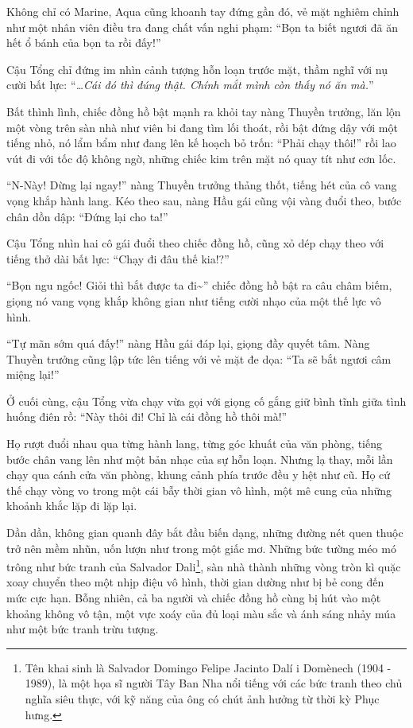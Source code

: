 \documentclass[../main.tex]{subfiles}
\begin{document}
Không chỉ có Marine, Aqua cũng khoanh tay đứng gần đó, vẻ mặt nghiêm chỉnh như một nhân viên điều tra đang chất vấn nghi phạm: ``Bọn ta biết ngươi đã ăn hết ổ bánh của bọn ta rồi đấy!''

Cậu Tổng chỉ đứng im nhìn cảnh tượng hỗn loạn trước mặt, thầm nghĩ với nụ cười bất lực: ``\textit{\dots Cái đó thì đúng thật. Chính mắt mình còn thấy nó ăn mà.}''

Bất thình lình, chiếc đồng hồ bật mạnh ra khỏi tay nàng Thuyền trưởng, lăn lộn một vòng trên sàn nhà như viên bi đang tìm lối thoát, rồi bật đứng dậy với một tiếng nhỏ, nó lẩm bẩm như đang lên kế hoạch bỏ trốn: ``Phải chạy thôi!'' rồi lao vút đi với tốc độ không ngờ, những chiếc kim trên mặt nó quay tít như cơn lốc.


``N-Này! Dừng lại ngay!'' nàng Thuyền trưởng thảng thốt, tiếng hét của cô vang vọng khắp hành lang. Kéo theo sau, nàng Hầu gái cũng vội vàng đuổi theo, bước chân dồn dập: ``Đứng lại cho ta!''

Cậu Tổng nhìn hai cô gái đuổi theo chiếc đồng hồ, cũng xỏ dép chạy theo với tiếng thở dài bất lực: ``Chạy đi đâu thế kia!?''

``Bọn ngu ngốc! Giỏi thì bắt được ta đi\~{}'' chiếc đồng hồ bật ra câu châm biếm, giọng nó vang vọng khắp không gian như tiếng cười nhạo của một thế lực vô hình.

``Tự mãn sớm quá đấy!'' nàng Hầu gái đáp lại, giọng đầy quyết tâm. Nàng Thuyền trưởng cũng lập tức lên tiếng với vẻ mặt đe dọa: ``Ta sẽ bắt ngươi câm miệng lại!''

Ở cuối cùng, cậu Tổng vừa chạy vừa gọi với giọng cố gắng giữ bình tĩnh giữa tình huống điên rồ: ``Này thôi đi! Chỉ là cái đồng hồ thôi mà!''

Họ rượt đuổi nhau qua từng hành lang, từng góc khuất của văn phòng, tiếng bước chân vang lên như một bản nhạc của sự hỗn loạn. Nhưng lạ thay, mỗi lần chạy qua cánh cửa văn phòng, khung cảnh phía trước đều y hệt như cũ. Họ cứ thế chạy vòng vo trong một cái bẫy thời gian vô hình, một mê cung của những khoảnh khắc lặp đi lặp lại.

Dần dần, không gian quanh đây bắt đầu biến dạng, những đường nét quen thuộc trở nên mềm nhũn, uốn lượn như trong một giấc mơ. Những bức tường méo mó trông như bức tranh của Salvador Dali\footnote{Tên khai sinh là Salvador Domingo Felipe Jacinto Dalí i Domènech (1904 - 1989), là một họa sĩ người Tây Ban Nha nổi tiếng với các bức tranh theo chủ nghĩa siêu thực, với kỹ năng của ông có chút ảnh hưởng từ thời kỳ Phục hưng.}, sàn nhà thành những vòng tròn kì quặc xoay chuyển theo một nhịp điệu vô hình, thời gian dường như bị bẻ cong đến mức cực hạn. Bỗng nhiên, cả ba người và chiếc đồng hồ cùng bị hút vào một khoảng không vô tận, một vực xoáy của đủ loại màu sắc và ánh sáng nhảy múa như một bức tranh trừu tượng.
\end{document}

